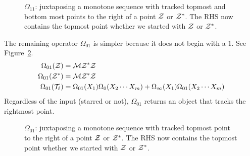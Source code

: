 \documentclass[12pt, a4paper, twoside]{report}
\begin{document}
\begin{figure}[ht]
 \centering
  \caption{$\Omega_{11}$: juxtaposing a monotone sequence with tracked topmost and bottom most points to the right of a point $\mathcal{Z}$ or $\mathcal{Z}^*$. The RHS now contains the topmost point whether we started with $\mathcal{Z}$ or $\mathcal{Z}^*$.}
  \label{fig:omega11}
\end{figure}

The remaining operator $\Omega_{01}$ is simpler because it does not begin with a $1$. See Figure~\ref{fig:omega01}.
\begin{align*}
  \Omega_{01}(\mathcal{Z}) &= \mathcal{M}\mathcal{Z}^*\mathcal{Z}\\
  \Omega_{01}(\mathcal{Z}^*) &= \mathcal{M}\mathcal{Z}^*\mathcal{Z}\\
  \Omega_{01}(\mathcal{T}_\ell) &= \Omega_{01}(X_1)\Omega_0(X_2\cdots X_m)+\Omega_\infty(X_1)\Omega_{01}(X_2\cdots X_m)
\end{align*}
Regardless of the input (starred or not), $\Omega_{01}$ returns an object that tracks the rightmost point.

\begin{figure}[ht]
 \centering
  \caption{$\Omega_{01}$: juxtaposing a monotone sequence with tracked topmost point to the right of a point $\mathcal{Z}$ or $\mathcal{Z}^*$. The RHS now contains the topmost point whether we started with $\mathcal{Z}$ or $\mathcal{Z}^*$.}
  \label{fig:omega01}
\end{figure}
\end{document}
